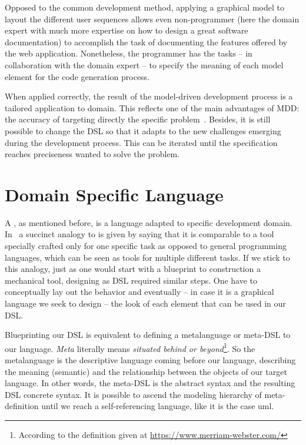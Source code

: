 Opposed to the common development method, applying a graphical model to layout the different user sequences allows even non-programmer (here the domain expert with much more expertise on how to design a great software documentation) to accomplish the task of documenting the features offered by the web application. Nonetheless, the programmer has the tasks -- in collaboration with the domain expert -- to specify the meaning of each model element for the code generation process. 

When applied correctly, the result of the model-driven development process is a tailored application to domain. This reflects one of the main advantages of MDD: the accuracy of targeting directly the specific problem~\cite{brambilla2017model}. Besides, it is still possible to change the DSL so that it adapts to the new challenges emerging during the development process. This can be iterated until the specification reaches preciseness wanted to solve the problem.

\section{Domain Specific Language}\label{sec:DSL}

A , as mentioned before, is a language adapted to specific development domain. In~\cite{Naujokat2018} a succinct analogy to  is given by saying that it is comparable to a tool specially crafted only for one specific task as opposed to general programming languages, which can be seen as tools for multiple different tasks. If we stick to this analogy, just as one would start with a blueprint to construction a mechanical tool, designing as DSL required similar steps. One have to conceptually lay out the behavior and eventually -- in case it is a graphical language we seek to design -- the look of each element that can be used in our DSL.

Blueprinting our DSL is equivalent to defining a metalanguage or meta-DSL to our language. \textit{Meta} literally means \textit{situated behind or beyond}\footnote{According to the definition given at \url{https://www.merriam-webster.com/}}. So the metalanguage is the descriptive language coming before our language, describing the meaning (semantic) and the relationship between the objects of our target language. In other words, the meta-DSL is the abstract syntax and the resulting DSL concrete syntax. It is possible to ascend the modeling hierarchy of meta-definition until we reach a self-referencing language, like it is the case \gls{uml}.

